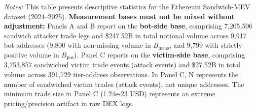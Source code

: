 \begin{table}[htbp]
\begin{minipage}{\linewidth}
\small
\textit{Notes:} This table presents descriptive statistics for the Ethereum Sandwich-MEV dataset (2024--2025). \textbf{Measurement bases must not be mixed without adjustment:} Panels A and B report on the \textbf{bot-side base}, comprising 7,205,506 sandwich attacker trade legs and \$247.52B in total notional volume across 9,917 bot addresses (9,800 with non-missing volume in $B_{\text{meas}}$, and 9,799 with strictly positive volume in $B_{\text{pos}}$). Panel C reports on the \textbf{victim-side base}, comprising 3,753,857 sandwiched victim trade events (attack events) and \$27.52B in total volume across 391,729 tier-address observations. In Panel C, N represents the number of sandwiched victim trades (attack events), not unique addresses. The minimum trade size in Panel C (1.24e-23 USD) represents an extreme pricing/precision artifact in raw DEX logs.
\end{minipage}
\end{table}
